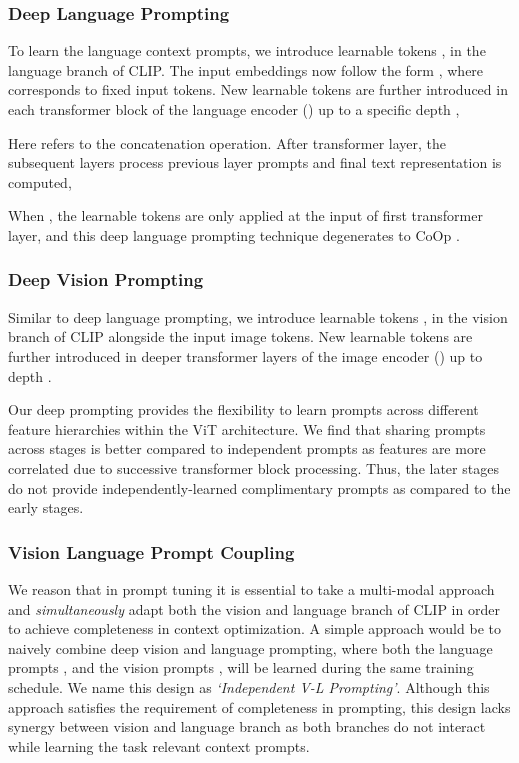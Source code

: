 \documentclass[10pt,twocolumn,letterpaper]{article}
\begin{document}
\subsubsection{Deep Language Prompting}
To learn the language context prompts, we introduce  learnable tokens , in the language branch of CLIP. The input embeddings now follow the form , where  corresponds to fixed input tokens. New learnable tokens are further introduced in each transformer block of the language encoder () up to a specific depth ,

Here   refers to the concatenation operation. After  transformer layer, the subsequent layers process previous layer prompts and final text representation  is computed,

When , the learnable tokens  are only applied at the input of first transformer layer, and this deep language prompting technique degenerates to CoOp \cite{zhou2022learning}. 

\subsubsection{Deep Vision Prompting}
Similar to deep language prompting, we introduce  learnable tokens , in the vision branch of CLIP alongside the input image tokens. New learnable tokens are further introduced in deeper transformer layers of the image encoder () up to depth .

Our deep prompting provides the flexibility to learn prompts across different feature hierarchies within the ViT architecture. We find that sharing prompts across stages is better compared to independent prompts as features are more correlated due to successive transformer block processing. Thus, the later stages do not provide independently-learned complimentary prompts as compared to the early stages.

\subsubsection{Vision Language Prompt Coupling} \label{section:compound_prompt_derivation}
We reason that in prompt tuning it is essential to take a multi-modal approach and \textit{simultaneously} adapt both the vision and language branch of CLIP in order to achieve completeness in context optimization. 
A simple approach would be to naively combine deep vision and language prompting, where both the language prompts , and the vision prompts , will be learned during the same training schedule. We name this design as \textit{`Independent V-L Prompting'}. Although this approach satisfies the requirement of completeness in prompting, this design lacks synergy between vision and language branch as both branches do not interact while learning the task relevant context prompts. 
\end{document}
